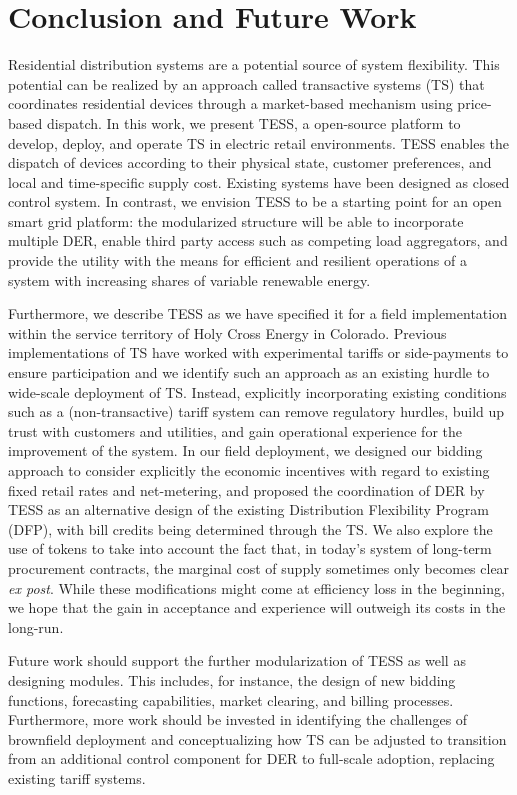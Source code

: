 \section{Conclusion and Future Work}\label{sec:conclusion}

Residential distribution systems are a potential source of system flexibility. This potential can be realized by an approach called transactive systems (TS) that coordinates residential devices through a market-based mechanism using price-based dispatch.
In this work, we present TESS, a open-source platform to develop, deploy, and operate TS in electric retail environments. TESS enables the dispatch of devices according to their physical state, customer preferences, and local and time-specific supply cost. 
Existing systems have been designed as closed control system. In contrast, we envision TESS to be a starting point for an open smart grid platform: the modularized structure will be able to incorporate multiple DER, enable third party access such as competing load aggregators, and provide the utility with the means for efficient and resilient operations of a system with increasing shares of variable renewable energy.

Furthermore, we describe TESS as we have specified it for a field implementation within the service territory of Holy Cross Energy in Colorado.
Previous implementations of TS have worked with experimental tariffs or side-payments to ensure participation and we identify such an approach as an existing hurdle to wide-scale deployment of TS. 
Instead, explicitly incorporating existing conditions such as a (non-transactive) tariff system can remove regulatory hurdles, build up trust with customers and utilities, and gain operational experience for the improvement of the system. 
In our field deployment, we designed our bidding approach to consider explicitly the economic incentives with regard to existing fixed retail rates and net-metering, and proposed the coordination of DER by TESS as an alternative design of the existing Distribution Flexibility Program (DFP), with bill credits being determined through the TS. 
We also explore the use of tokens to take into account the fact that, in today's system of long-term procurement contracts, the marginal cost of supply sometimes only becomes clear \textit{ex post}.
While these modifications might come at efficiency loss in the beginning, we hope that the gain in acceptance and experience will outweigh its costs in the long-run.

Future work should support the further modularization of TESS as well as designing modules. This includes, for instance, the design of new bidding functions, forecasting capabilities, market clearing, and billing processes.
Furthermore, more work should be invested in identifying the challenges of brownfield deployment and conceptualizing how TS can be adjusted to transition from an additional control component for DER to full-scale adoption, replacing existing tariff systems.
